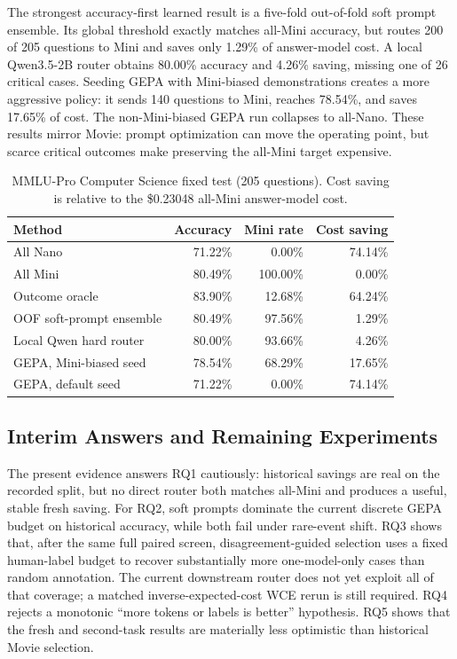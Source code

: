 The strongest accuracy-first learned result is a five-fold out-of-fold soft
prompt ensemble. Its global threshold exactly matches all-Mini accuracy, but
routes 200 of 205 questions to Mini and saves only 1.29\% of answer-model cost.
A local Qwen3.5-2B router obtains 80.00\% accuracy and 4.26\% saving, missing one
of 26 critical cases. Seeding GEPA with Mini-biased demonstrations creates a
more aggressive policy: it sends 140 questions to Mini, reaches 78.54\%, and
saves 17.65\% of cost. The non-Mini-biased GEPA run collapses to all-Nano.
These results mirror Movie: prompt optimization can move the operating point,
but scarce critical outcomes make preserving the all-Mini target expensive.

\begin{table}[t]
  \centering
  \small
  \caption{MMLU-Pro Computer Science fixed test (205 questions). Cost saving is
  relative to the \$0.23048 all-Mini answer-model cost.}
  \label{tab:qa}
  \begin{tabular}{lrrr}
    \toprule
    Method & Accuracy & Mini rate & Cost saving\\
    \midrule
    All Nano & 71.22\% & 0.00\% & 74.14\%\\
    All Mini & 80.49\% & 100.00\% & 0.00\%\\
    Outcome oracle & 83.90\% & 12.68\% & 64.24\%\\
    OOF soft-prompt ensemble & 80.49\% & 97.56\% & 1.29\%\\
    Local Qwen hard router & 80.00\% & 93.66\% & 4.26\%\\
    GEPA, Mini-biased seed & 78.54\% & 68.29\% & 17.65\%\\
    GEPA, default seed & 71.22\% & 0.00\% & 74.14\%\\
    \bottomrule
  \end{tabular}
\end{table}

\subsection{Interim Answers and Remaining Experiments}

The present evidence answers RQ1 cautiously: historical savings are real on the
recorded split, but no direct router both matches all-Mini and produces a useful,
stable fresh saving. For RQ2, soft prompts dominate the current discrete GEPA
budget on historical accuracy, while both fail under rare-event shift. RQ3 shows that, after the same full paired screen, disagreement-guided
selection uses a fixed human-label budget to recover substantially more
one-model-only cases than random annotation. The current downstream router does
not yet exploit all of that coverage; a matched
inverse-expected-cost WCE rerun is still required. RQ4 rejects a
monotonic ``more tokens or labels is better'' hypothesis. RQ5 shows that the
fresh and second-task results are materially less optimistic than historical
Movie selection.

